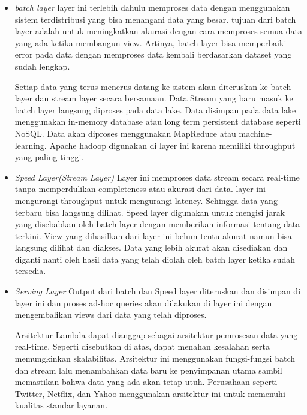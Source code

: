 \begin{itemize}
	\item[]{\textit{batch layer}\newline
	layer ini terlebih dahulu memproses data dengan menggunakan sistem terdistribusi yang bisa 		
	menangani data yang besar. tujuan dari batch layer adalah untuk meningkatkan akurasi dengan 	
	cara memproses semua data yang ada ketika membangun view. Artinya, batch layer bisa 			
	memperbaiki error pada data dengan memproses data kembali berdasarkan dataset yang sudah 		
	lengkap.

	Setiap data yang terus menerus datang ke sistem akan diteruskan ke batch layer dan stream 		
	layer secara bersamaan. Data Stream yang baru masuk ke batch layer langsung diproses pada 		
	data lake. Data disimpan pada data lake menggunakan in-memory database atau long term 			
	persistent database seperti NoSQL. Data akan diproses menggunakan MapReduce atau machine-		
	learning. Apache hadoop digunakan di layer ini karena memiliki throughput yang paling 			
	tinggi.	
	}
	
	\item[]{\textit{Speed Layer(Stream Layer)}\newline
	Layer ini memproses data stream secara real-time tanpa memperdulikan completeness atau 			
	akurasi dari data. layer ini mengurangi throughput untuk mengurangi latency. Sehingga data 		
	yang terbaru bisa langsung dilihat. Speed layer digunakan untuk mengisi jarak yang 				
	disebabkan oleh batch layer dengan memberikan informasi tentang data terkini. View yang 		
	dihasilkan dari layer ini belum tentu akurat namun bisa langsung dilihat dan diakses. Data 		
	yang lebih akurat akan disediakan dan diganti nanti oleh hasil data yang telah diolah oleh 		
	batch layer ketika sudah tersedia.
	}
	
	\item[]{\textit{Serving Layer}\newline
	Output dari batch dan Speed layer diteruskan dan disimpan di layer ini dan proses ad-hoc 		
	queries akan dilakukan di layer ini dengan mengembalikan views dari data yang telah 			
	diproses.

	Arsitektur Lambda dapat dianggap sebagai arsitektur pemrosesan data yang real-time. Seperti 	
	disebutkan di atas, dapat menahan kesalahan serta memungkinkan skalabilitas. Arsitektur ini 	
	menggunakan fungsi-fungsi batch dan stream lalu menambahkan data baru ke penyimpanan utama 		
	sambil memastikan bahwa data yang ada akan tetap utuh. Perusahaan seperti Twitter, Netflix, 	
	dan Yahoo menggunakan arsitektur ini untuk memenuhi kualitas standar layanan.

	}
\end{itemize}

